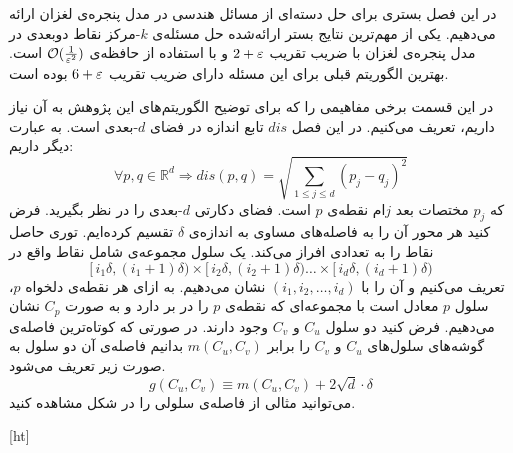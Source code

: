 


در این فصل بستری برای حل دسته‌ای از مسائل هندسی در مدل پنجره‌ی لغزان ارائه می‌دهیم. یکی از مهم‌ترین نتایج بستر ارائه‌شده حل مسئله‌ی $k$-مرکز نقاط دوبعدی در مدل پنجره‌ی لغزان با ضریب تقریب $2+\varepsilon$ و با استفاده از حافظه‌ی $\mathcal{O}(\frac{1}{\varepsilon^2})$ است. بهترین الگوریتم قبلی برای این مسئله دارای ضریب تقریب $6+\varepsilon$ بوده است.

در این قسمت برخی مفاهیمی را که برای توضیح الگوریتم‌های این پژوهش به آن نیاز داریم، تعریف می‌کنیم. در این فصل $dis$ تابع اندازه‌ در فضای $d$-بعدی است. به عبارت دیگر داریم:
$$ \forall p, q \in \mathbb{R}^d \Rightarrow dis(p,q) = \sqrt{\sum_{1 \le j \le d} (p_j-q_j)^2}   $$
که $p_j$ مختصات بعد $j$ام نقطه‌ی $p$ است.
فضای دکارتی $d$-بعدی را در نظر بگیرید. فرض کنید هر محور آن را به فاصله‌های مساوی به اندازه‌ی $\delta$ تقسیم کرده‌ایم. توری  حاصل نقاط را به تعدادی  افراز می‌کند.  یک سلول مجموعه‌ی شامل نقاط واقع در
$$ [\, i_1 \delta, (i_1+1) \delta ) \times [\, i_2 \delta, (i_2+1) \delta ) \ldots \times [\, i_d \delta, (i_d+1) \delta )  $$
تعریف می‌کنیم و آن را با $(i_1, i_2, \ldots, i_d)$ نشان می‌دهیم. به ازای هر نقطه‌ی دلخواه $p$، سلول $p$ معادل است با مجموعه‌ای که نقطه‌ی $p$ را در بر دارد و به صورت $C_p$ نشان می‌دهیم.
فرض کنید دو سلول $C_u$ و $C_v$ وجود دارند.  در صورتی که کوتاه‌ترین فاصله‌ی گوشه‌های سلول‌های $C_u$ و $C_v$ را برابر $m(C_u, C_v)$ بدانیم فاصله‌ی آن دو سلول به صورت زیر تعریف می‌شود. 
$$ g(C_u, C_v) \equiv m(C_u, C_v) + 2 \sqrt{d} \cdot \delta $$ 
می‌توانید مثالی از فاصله‌ی سلولی را در شکل مشاهده کنید.

[ht]

